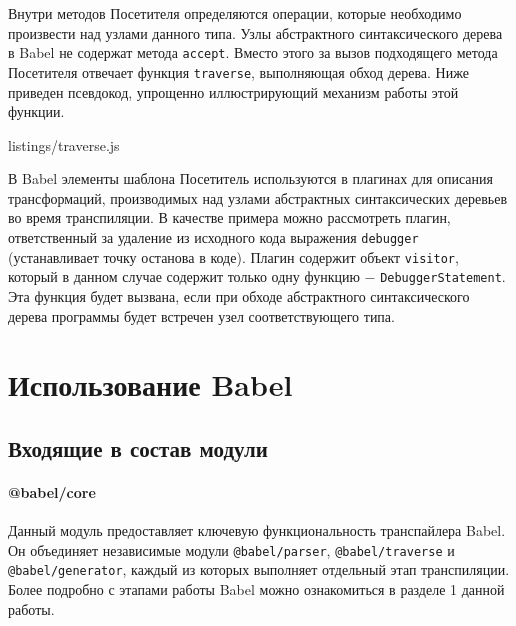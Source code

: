 \documentclass[14pt, a4paper]{article}
\def\code#1{\texttt{#1}} %
\begin{document}
Внутри методов Посетителя определяются операции, которые необходимо произвести над узлами данного типа.
Узлы абстрактного синтаксического дерева в Babel не содержат метода \code{accept}. Вместо этого за вызов
подходящего метода Посетителя отвечает функция \code{traverse}, выполняющая обход дерева. Ниже приведен 
псевдокод, упрощенно иллюстрирующий механизм работы этой функции.


  {listings/traverse.js}


В Babel элементы шаблона Посетитель используются в плагинах для описания трансформаций, производимых 
над узлами абстрактных синтаксических деревьев во время транспиляции. В качестве примера можно рассмотреть 
плагин, ответственный за удаление из исходного кода выражения \code{debugger} (устанавливает точку 
останова в коде). Плагин содержит объект \code{visitor}, который в данном случае содержит только одну 
функцию $-$ \linebreak \code{DebuggerStatement}. Эта функция будет вызвана, если при обходе абстрактного 
синтаксического дерева программы будет встречен узел соответствующего типа.  



\pagebreak

\section{Использование Babel}
\subsection{Входящие в состав модули}
\paragraph{@babel/core} \mbox{}

Данный модуль предоставляет ключевую функциональность транспайлера Babel. Он объединяет независимые 
модули \code{@babel/parser}, \linebreak \code{@babel/traverse} и \code{@babel/generator}, каждый из которых 
выполняет отдельный этап транспиляции. Более подробно с этапами работы Babel можно ознакомиться 
в разделе 1 данной работы.
\end{document}
